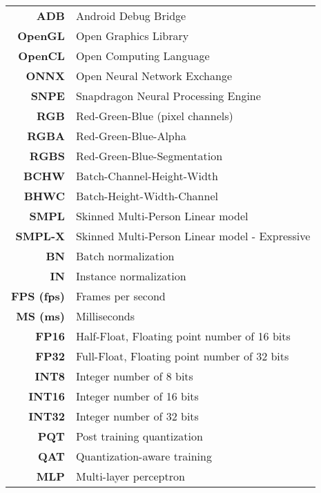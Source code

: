 \begin{table}[!ht]
\begin{tabular}{>{\bf}r l}
		ADB & Android Debug Bridge \\
		OpenGL & Open Graphics Library \\
		OpenCL & Open Computing Language \\
		ONNX & Open Neural Network Exchange \\
		SNPE & Snapdragon Neural Processing Engine \\
		RGB & Red-Green-Blue (pixel channels) \\
		RGBA & Red-Green-Blue-Alpha \\
		RGBS & Red-Green-Blue-Segmentation \\
		BCHW & Batch-Channel-Height-Width \\
		BHWC & Batch-Height-Width-Channel \\
		SMPL & Skinned Multi-Person Linear model \cite{dnn:smpl15} \\
		SMPL-X & Skinned Multi-Person Linear model - Expressive \cite{dnn:smplx19}\\
		BN & Batch normalization \\
		IN & Instance normalization \\
		FPS (fps) & Frames per second\\
		MS (ms) & Milliseconds \\
		FP16 & Half-Float, Floating point number of 16 bits \\
		FP32 & Full-Float, Floating point number of 32 bits \\
		INT8 & Integer number of 8 bits \\
		INT16 & Integer number of 16 bits \\
		INT32 & Integer number of 32 bits \\
		PQT & Post training quantization \\
		QAT & Quantization-aware training \\
		MLP & Multi-layer perceptron \\
	\end{tabular}
\end{table}